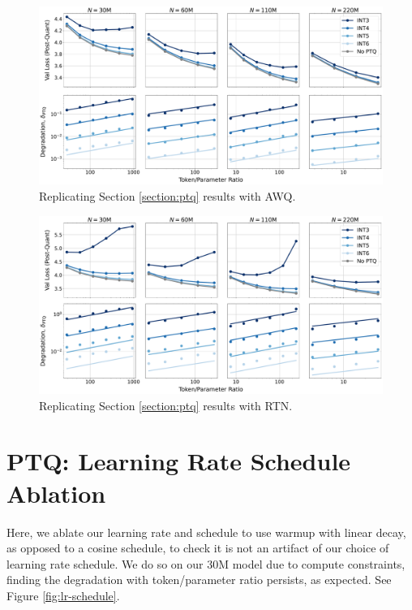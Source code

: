 \documentclass[11pt]{article}
\begin{document}
\begin{figure}
    \centering
    \includegraphics[width=\linewidth]{tpr_awq_new_evals.pdf}
    \caption{{Replicating Section \ref{section:ptq} results with AWQ. }}
    \label{fig:awq-replication}
\end{figure}

\begin{figure}
    \centering
    \includegraphics[width=\linewidth]{tpr_rtn_new_evals.pdf}
    \caption{{Replicating Section \ref{section:ptq} results with RTN. }}
    \label{fig:rtn-replication}
\end{figure}

\section{PTQ: Learning Rate Schedule Ablation}

Here, we ablate our learning rate and schedule to use warmup with linear decay, as opposed to a cosine schedule, to check it is not an artifact of our choice of learning rate schedule. We do so on our 30M model due to compute constraints, finding the degradation with token/parameter ratio persists, as expected. See Figure \ref{fig:lr-schedule}. 
\end{document}
